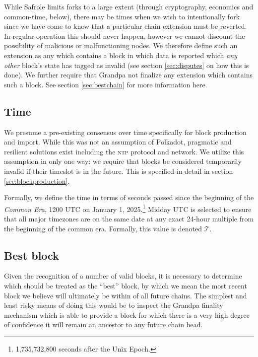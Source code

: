 While Safrole limits forks to a large extent (through cryptography, economics and common-time, below), there may be times when we wish to intentionally fork since we have come to know that a particular chain extension must be reverted. In regular operation this should never happen, however we cannot discount the possibility of malicious or malfunctioning nodes. We therefore define such an extension as any which contains a block in which data is reported which \emph{any other} block's state has tagged as invalid (see section \ref{sec:disputes} on how this is done). We further require that Grandpa not finalize any extension which contains such a block. See section \ref{sec:bestchain} for more information here.

\subsection{Time}\label{sec:commonera}

We presume a pre-existing consensus over time specifically for block production and import. While this was not an assumption of Polkadot, pragmatic and resilient solutions exist including the \textsc{ntp} protocol and network. We utilize this assumption in only one way: we require that blocks be considered temporarily invalid if their timeslot is in the future. This is specified in detail in section \ref{sec:blockproduction}.

Formally, we define the time in terms of seconds passed since the beginning of the \Jam\emph{Common Era}, 1200 UTC on January 1, 2025.\footnote{1,735,732,800 seconds after the Unix Epoch.} Midday UTC is selected to ensure that all major timezones are on the same date at any exact 24-hour multiple from the beginning of the common era. Formally, this value is denoted $\mathcal{T}$.

\subsection{Best block}

Given the recognition of a number of valid blocks, it is necessary to determine which should be treated as the ``best'' block, by which we mean the most recent block we believe will ultimately be within of all future \Jam chains. The simplest and least risky means of doing this would be to inspect the Grandpa finality mechanism which is able to provide a block for which there is a very high degree of confidence it will remain an ancestor to any future chain head.

